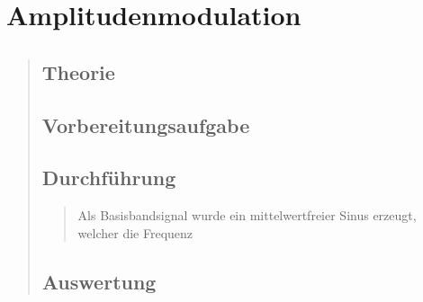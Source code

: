 \section{Amplitudenmodulation}
\begin{quote}
	\subsection{Theorie}
    \begin{quote}
        
    \end{quote}
    
    \subsection{Vorbereitungsaufgabe}
    \begin{quote}
     
    \end{quote}
    
    \subsection{Durchführung}
    \begin{quote}
                    Als Basisbandsignal wurde ein mittelwertfreier Sinus erzeugt, welcher die
            Frequenz
    \end{quote}
    
    \subsection{Auswertung}
    \begin{quote}
        
    \end{quote}
\end{quote}




